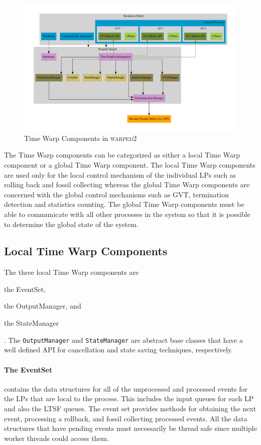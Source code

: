 \documentclass[11pt]{book}
\begin{document}
\begin{figure}[H]
    \centering
    \includegraphics[width=\textwidth,quiet]{figs/graphviz/warped2_overview.pdf}
    \caption{Time Warp Components in \textsc{warped2}}\label{warped2_architecture}
\end{figure}

The Time Warp components can be categorized as either a local Time Warp component or a global
Time Warp component.  The local Time Warp components are used only for the local control
mechanism of the individual LPs such as rolling back and fossil collecting whereas
the global Time Warp components are concerned with the global control mechanisms such as GVT,
termination detection and statistics counting.  The global Time Warp components must be able to
communicate with all other processes in the system so that it is possible to determine the
global state of the system.

\subsection{Local Time Warp Components}

The three local Time Warp components are \begin{inparaenum}[(1)] \item the EventSet,
\item the OutputManager, and \item the StateManager\end{inparaenum}.  The \texttt{OutputManager} and
\texttt{StateManager} are abstract base classes that have a well defined API for cancellation
and state saving techniques, respectively.  

\paragraph{The EventSet} contains the data structures for all of the unprocessed and
processed events for the LPs that are local to the process.  This includes the input queues for
each LP and also the LTSF queues.  The event set provides methods for obtaining the next event,
processing a rollback, and fossil collecting processed events.  All the data structures that have
pending events must necessarily be thread safe since multiple worker threads could access them.
\end{document}
